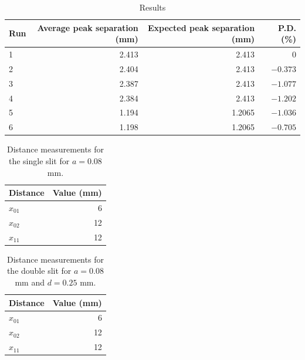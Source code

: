 \begin{table}[ht!]
	\centering
	\begin{tabular}{|l|r|r|r|}
		\hline
		Run & Average peak separation (mm) & Expected peak separation (mm) & P.D. (\%) \\
		\hline
		1 & 2.413 & 2.413 & 0 \\
		2 & 2.404 & 2.413 & $-0.373$ \\
		3 & 2.387 & 2.413 & $-1.077$ \\
		4 & 2.384 & 2.413 & $-1.202$ \\
		5 & 1.194 & 1.2065 & $-1.036$ \\
		6 & 1.198 & 1.2065 &  $-0.705$\\
		\hline
	\end{tabular}
	\caption{Results}
	\label{table.10.results}
\end{table}
\begin{table}[ht!]
	\centering
	\begin{tabular}{|l|r|} \hline
		Distance & Value (mm) \\
		\hline
		$x_{01}$ & 6 \\
		$x_{02}$ & 12 \\
		$x_{11}$ & 12 \\
		\hline
	\end{tabular}
	\caption{Distance measurements for the single slit for $a = 0.08$ mm.}
	\label{table.10.part1.single}
\end{table}
\begin{table}[ht!]
	\centering
	\begin{tabular}{|l|r|} \hline
		Distance & Value (mm) \\
		\hline
		$x_{01}$ & 6 \\
		$x_{02}$ & 12 \\
		$x_{11}$ & 12 \\
		\hline
	\end{tabular}
	\caption{Distance measurements for the double slit for $a = 0.08$ mm and $d = 0.25$ mm.}
	\label{table.10.part1.double}
\end{table}
\newpage
